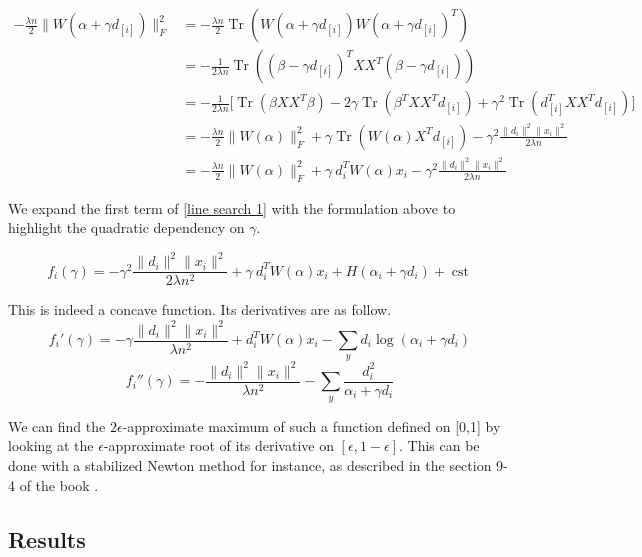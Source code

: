 \documentclass{article}
\DeclareMathOperator{\Tr}{Tr}
\DeclareMathOperator{\cst}{cst}
\DeclareMathOperator{\1}{\mathbb{1}}
\begin{document}
\begin{align*}
	-\frac{\lambda n}{2} \|W(\alpha + \gamma d_{[i]})\|_F^2 & = -\frac{\lambda n}{2} \Tr(W(\alpha + \gamma d_{[i]}) W(\alpha + \gamma d_{[i]})^T) \\
	& = -\frac{1}{2\lambda n} \Tr((\beta - \gamma d_{[i]})^T X X^T (\beta - \gamma d_{[i]})) \\
	& = -\frac{1}{2\lambda n} \bigg[ \Tr(\beta X X^T \beta) - 2\gamma\Tr(\beta^TXX^Td_{[i]}) + \gamma^2 \Tr(d_{[i]}^TXX^Td_{[i]})\bigg] \\
	& = -\frac{\lambda n}{2} \|W(\alpha)\|_F^2 + \gamma\Tr(W(\alpha)X^Td_{[i]}) - \gamma^2 \frac{\|d_i\|^2 \|x_i\|^2}{2\lambda n} \\
	& = -\frac{\lambda n}{2} \|W(\alpha)\|_F^2 + \gamma \ d_i^T W(\alpha) x_i - \gamma^2 \frac{\|d_i\|^2 \|x_i\|^2}{2\lambda n}
\end{align*}

We expand the first term  of \ref{line search 1} with the formulation above to highlight the quadratic dependency on $\gamma$.

\begin{equation}
	f_i(\gamma) = - \gamma^2 \frac{\|d_i\|^2 \|x_i\|^2}{2\lambda n^2} + \gamma \ d_i^T W(\alpha) x_i + H(\alpha_i + \gamma d_i) + \cst
\end{equation} 

This is indeed a concave function.
Its derivatives are as follow.
\begin{equation}
	f_i'(\gamma) = - \gamma \frac{\|d_i\|^2 \|x_i\|^2}{\lambda n^2} + d_i^T W(\alpha) x_i- \sum_y d_i \log(\alpha_i + \gamma d_i)
\end{equation}
\begin{equation}
	f_i''(\gamma) = - \frac{\|d_i\|^2 \|x_i\|^2}{\lambda n^2} - \sum_y \frac{d_i^2}{\alpha_i + \gamma d_i}
\end{equation}

We can find the $2\epsilon$-approximate maximum of such a function defined on [0,1] by looking at the $\epsilon$-approximate root of its derivative on $[\epsilon,1-\epsilon]$.
This can be done with a stabilized Newton method for instance, as described in the section 9-4 of the book \cite{press_numerical_1992}.





\subsection{Results}
\end{document}
